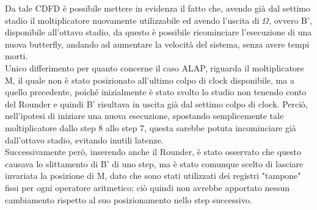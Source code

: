 \documentclass[a4paper, titlepage]{article}
\begin{document}
Da tale CDFD è possibile mettere in evidenza il fatto che, avendo già dal settimo stadio il moltiplicatore nuovamente utilizzabile ed avendo l'uscita di $\Omega$, ovvero B', disponibile all'ottavo stadio, da questo è possibile ricominciare l'esecuzione di una nuova butterfly, andando ad aumentare la velocità del sistema, senza avere tempi morti.\\Unico differimento per quanto concerne il caso ALAP, riguarda il moltiplicatore M, il quale non è stato posizionato all'ultimo colpo di clock disponibile, ma a quello precedente, poiché inizialmente è stato svolto lo studio non tenendo conto del Rounder e quindi B' risultava in uscita già dal settimo colpo di clock. Perciò, nell'ipotesi di iniziare una nuova esecuzione, spostando semplicemente tale moltiplicatore dallo step 8 allo step 7, questa sarebbe potuta incominciare già dall'ottavo stadio, evitando inutili latenze.\\Successivamente però, inserendo anche il Rounder, è stato osservato che questo causava lo slittamento di B' di uno step, ma è stato comunque scelto di lasciare invariata la posizione di M, dato che sono stati utilizzati dei registri "tampone" fissi per ogni operatore aritmetico; ciò quindi non avrebbe apportato nessun cambiamento rispetto al suo posizionamento nello step successivo.
\end{document}
